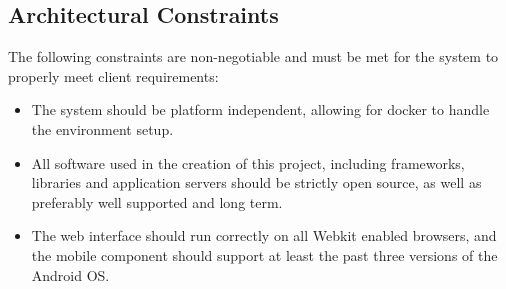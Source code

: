 \documentclass[11pt,a4paper]{article}
\begin{document}
\subsection{Architectural Constraints}
The following constraints are non-negotiable and must be met for the system to properly meet client requirements:
\begin{itemize}
	\item The system should be platform independent, allowing for docker to handle the environment setup.
	\item All software used in the creation of this project, including frameworks, libraries and application servers should be strictly open source, as well as preferably well supported and long term.
	\item The web interface should run correctly on all Webkit enabled browsers, and the mobile component should support at least the past three versions of the Android OS.
\end{itemize}

\pagebreak
\end{document}
